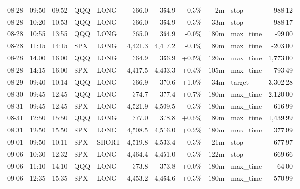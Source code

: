 \documentclass[11pt,a4paper,twoside]{article}
\begin{document}
\begin{center}
\begin{longtable}{>{\color{txtmain}}l l l l l r r r r >{\color{txtmain}}l r}
08-28 & 09:50 & 09:52 & QQQ & LONG & 366.0 & 364.9 & \textcolor{lossred}{-0.3\%} & 2m & stop & \textcolor{lossred}{-988.12} \\
08-28 & 10:20 & 10:53 & QQQ & LONG & 366.0 & 364.9 & \textcolor{lossred}{-0.3\%} & 33m & stop & \textcolor{lossred}{-988.17} \\
08-28 & 10:55 & 13:55 & QQQ & LONG & 365.0 & 364.9 & \textcolor{lossred}{-0.0\%} & 180m & max\_time & \textcolor{lossred}{-99.00} \\
08-28 & 11:15 & 14:15 & SPX & LONG & 4,421.3 & 4,417.2 & \textcolor{lossred}{-0.1\%} & 180m & max\_time & \textcolor{lossred}{-203.00} \\
08-28 & 14:00 & 16:00 & QQQ & LONG & 364.9 & 366.9 & \textcolor{wingreen}{+0.5\%} & 120m & max\_time & \textcolor{wingreen}{1,773.00} \\
08-28 & 14:15 & 16:00 & SPX & LONG & 4,417.5 & 4,433.3 & \textcolor{wingreen}{+0.4\%} & 105m & max\_time & \textcolor{wingreen}{793.49} \\
08-29 & 09:40 & 10:14 & QQQ & LONG & 366.9 & 370.6 & \textcolor{wingreen}{+1.0\%} & 34m & target & \textcolor{wingreen}{3,302.28} \\
08-30 & 09:45 & 12:45 & QQQ & LONG & 374.7 & 377.4 & \textcolor{wingreen}{+0.7\%} & 180m & max\_time & \textcolor{wingreen}{2,120.00} \\
08-31 & 09:45 & 12:45 & SPX & LONG & 4,521.9 & 4,509.5 & \textcolor{lossred}{-0.3\%} & 180m & max\_time & \textcolor{lossred}{-616.99} \\
08-31 & 12:50 & 15:50 & QQQ & LONG & 377.0 & 378.8 & \textcolor{wingreen}{+0.5\%} & 180m & max\_time & \textcolor{wingreen}{1,439.99} \\
08-31 & 12:50 & 15:50 & SPX & LONG & 4,508.5 & 4,516.0 & \textcolor{wingreen}{+0.2\%} & 180m & max\_time & \textcolor{wingreen}{377.99} \\
09-01 & 09:50 & 10:11 & SPX & SHORT & 4,519.8 & 4,533.4 & \textcolor{lossred}{-0.3\%} & 21m & stop & \textcolor{lossred}{-677.97} \\
09-06 & 10:30 & 12:32 & SPX & LONG & 4,464.4 & 4,451.0 & \textcolor{lossred}{-0.3\%} & 122m & stop & \textcolor{lossred}{-669.66} \\
09-06 & 11:10 & 14:10 & QQQ & LONG & 373.8 & 373.8 & \textcolor{wingreen}{+0.0\%} & 180m & max\_time & \textcolor{wingreen}{64.00} \\
09-06 & 12:35 & 15:35 & SPX & LONG & 4,453.2 & 4,464.6 & \textcolor{wingreen}{+0.3\%} & 180m & max\_time & \textcolor{wingreen}{570.99} \\

\end{longtable}
\end{center}
\end{document}

